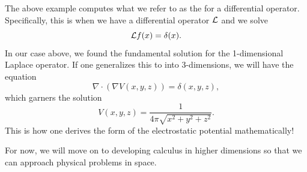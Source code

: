 	
	The above example computes what we refer to as the  for a differential operator. Specifically, this is when we have a differential operator $\mathcal{L}$ and we solve
	\[
	\mathcal{L} f(x) = \delta(x).
	\]
	In our case above, we found the fundamental solution for the 1-dimensional Laplace operator.  If one generalizes this to into 3-dimensions, we will have the equation
	\[
	\nabla \cdot (\nabla V(x,y,z)) = \delta(x,y,z),
	\]
	which garners the solution
	\[
	V(x,y,z) = \frac{1}{4\pi \sqrt{x^2+y^2+z^2}}.
	\]
	This is how one derives the form of the electrostatic potential mathematically!
	
	For now, we will move on to developing calculus in higher dimensions so that we can approach physical problems in space.